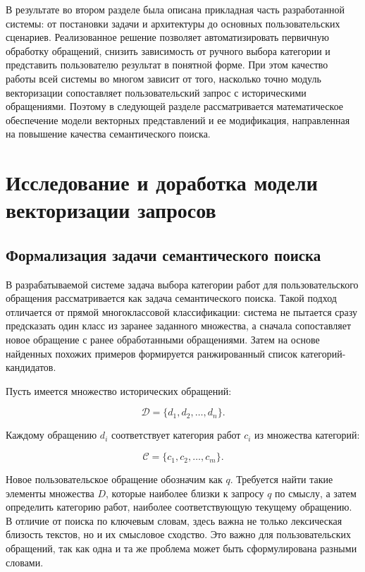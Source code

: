 \documentclass[14pt,a4paper]{extarticle}
\numberwithin{figure}{section}
\numberwithin{table}{section}
\begin{document}
В результате во втором разделе была описана прикладная часть разработанной
системы: от постановки задачи и архитектуры до основных пользовательских
сценариев. Реализованное решение позволяет автоматизировать первичную
обработку обращений, снизить зависимость от ручного выбора категории и
представить пользователю результат в понятной форме. При этом качество
работы всей системы во многом зависит от того, насколько точно модуль
векторизации сопоставляет пользовательский запрос с историческими
обращениями. Поэтому в следующей разделе рассматривается математическое
обеспечение модели векторных представлений и ее модификация, направленная на
повышение качества семантического поиска.

\clearpage
\section{Исследование и доработка модели векторизации запросов}

\subsection{Формализация задачи семантического поиска}

В разрабатываемой системе задача выбора категории работ для
пользовательского обращения рассматривается как задача семантического
поиска. Такой подход отличается от прямой многоклассовой классификации:
система не пытается сразу предсказать один класс из заранее заданного
множества, а сначала сопоставляет новое обращение с ранее обработанными
обращениями. Затем на основе найденных похожих примеров формируется
ранжированный список категорий-кандидатов.

Пусть имеется множество исторических обращений:

\begin{equation}\mathcal{D}=\{d_1,d_2,\ldots,d_n\}.\end{equation}

Каждому обращению \(d_{i}\) соответствует категория работ \(c_{i}\) из
множества категорий:

\begin{equation}\mathcal{C}=\{c_1,c_2,\ldots,c_m\}.\end{equation}

Новое пользовательское обращение обозначим как \(q\). Требуется найти
такие элементы множества \(D\), которые наиболее близки к запросу \(q\)
по смыслу, а затем определить категорию работ, наиболее соответствующую
текущему обращению. В отличие от поиска по ключевым словам, здесь важна
не только лексическая близость текстов, но и их смысловое сходство. Это
важно для пользовательских обращений, так как одна и та же проблема
может быть сформулирована разными словами.
\end{document}
